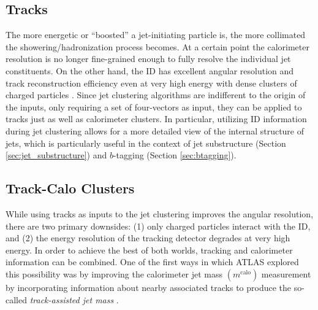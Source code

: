 \subsection{Tracks}
The more energetic or ``boosted'' a jet-initiating particle is, the more collimated the showering/hadronization process becomes.
At a certain point the calorimeter resolution is no longer fine-grained enough to fully resolve the individual jet constituents.
On the other hand, the ID has excellent angular resolution and track reconstruction efficiency even at very high energy with dense clusters of charged particles \cite{Aaboud:2017all}.
Since jet clustering algorithms are indifferent to the origin of the inputs, only requiring a set of four-vectors as input, they can be applied to tracks just as well as calorimeter clusters.
In particular, utilizing ID information during jet clustering allows for a more detailed view of the internal structure of jets, which is particularly useful in the context of jet substructure (Section \ref{sec:jet_substructure}) and $b$-tagging (Section \ref{sec:btagging}).

\subsection{Track-Calo Clusters}
\label{sec:tcc_constituents}
\newcommand{\mCALO}{\ensuremath{m^{\mathrm{calo}}}}
\newcommand{\mTRACK}{\ensuremath{m^{\mathrm{track}}}}
\newcommand{\mTA}{\ensuremath{m^{\mathrm{TA}}}}
\newcommand{\ptCALO}{\ensuremath{p_T^{\mathrm{calo}}}}
\newcommand{\ptTRACK}{\ensuremath{p_T^{\mathrm{track}}}}
While using tracks as inputs to the jet clustering improves the angular resolution, there are two primary downsides: (1) only charged particles interact with the ID, and (2) the energy resolution of the tracking detector degrades at very high energy.
In order to achieve the best of both worlds, tracking and calorimeter information can be combined.
One of the first ways in which ATLAS explored this possibility was by improving the calorimeter jet mass $(\mCALO)$ measurement by incorporating information about nearby associated tracks to produce the so-called \textit{track-assisted jet mass} \cite{ATLAS-CONF-2016-035}.

